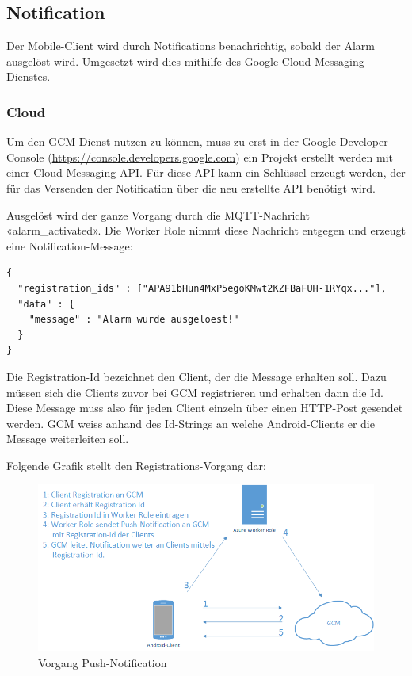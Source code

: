 \subsection{Notification}
Der Mobile-Client wird durch Notifications benachrichtig, sobald der Alarm ausgelöst wird. Umgesetzt wird dies mithilfe des Google Cloud Messaging Dienstes.

\subsubsection{Cloud}
Um den GCM-Dienst nutzen zu können, muss zu erst in der Google Developer Console (\url{https://console.developers.google.com}) ein Projekt erstellt werden mit einer Cloud-Messaging-API. Für diese API kann ein Schlüssel erzeugt werden, der für das Versenden der Notification über die neu erstellte API benötigt wird.

Ausgelöst wird der ganze Vorgang durch die MQTT-Nachricht «alarm\_activated». Die Worker Role nimmt diese Nachricht entgegen und erzeugt eine Notification-Message:

\begin{lstlisting}[style=csharp, caption=Notification.cs - Notification Message]
{
  "registration_ids" : ["APA91bHun4MxP5egoKMwt2KZFBaFUH-1RYqx..."],
  "data" : {
  	"message" : "Alarm wurde ausgeloest!"
  }
}
\end{lstlisting}

Die Registration-Id bezeichnet den Client, der die Message erhalten soll. Dazu müssen sich die Clients zuvor bei GCM registrieren und erhalten dann die Id. Diese Message muss also für jeden Client einzeln über einen HTTP-Post gesendet werden. GCM weiss anhand des Id-Strings an welche Android-Clients er die Message weiterleiten soll.

Folgende Grafik stellt den Registrations-Vorgang dar:
\begin{figure}[H]
	\centering
		\includegraphics[scale=0.7]{report/img/gcm}
	\caption{Vorgang Push-Notification}
	\label{fig:notification}
\end{figure}

